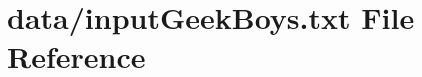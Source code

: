 \hypertarget{inputGeekBoys_8txt}{}\section{data/input\+Geek\+Boys.txt File Reference}
\label{inputGeekBoys_8txt}
